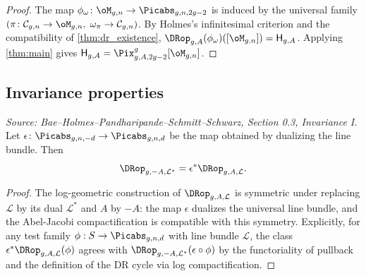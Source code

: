 \begin{proof}
  The map $\phi_\omega\colon \oM_{g,n} \to \Picabs_{g,n,2g-2}$ is induced by the universal
  family $(\pi\colon \mathcal{C}_{g,n} \to \oM_{g,n},\; \omega_\pi \to \mathcal{C}_{g,n})$.
  By Holmes's infinitesimal criterion and the compatibility of \cref{thm:dr_existence},
  $\DRop_{g,A}(\phi_\omega)([\oM_{g,n}]) = \mathsf{H}_{g,A}$.
  Applying \cref{thm:main} gives $\mathsf{H}_{g,A} = \Pix^g_{g,A,2g-2}[\oM_{g,n}]$.
\end{proof}

\subsection{Invariance properties}

\begin{lemma}
  \label{lem:invariance_dualizing}
  \textit{Source: Bae--Holmes--Pandharipande--Schmitt--Schwarz, Section 0.3, Invariance I.}
  Let $\epsilon\colon \Picabs_{g,n,-d} \to \Picabs_{g,n,d}$ be the map obtained by dualizing
  the line bundle.  Then
  \[
    \DRop_{g,-A,\mathcal{L}^*} = \epsilon^* \DRop_{g,A,\mathcal{L}}.
  \]
\end{lemma}

\begin{proof}
  The log-geometric construction of $\DRop_{g,A,\mathcal{L}}$ is symmetric under replacing
  $\mathcal{L}$ by its dual $\mathcal{L}^*$ and $A$ by $-A$: the map
  $\epsilon$ dualizes the universal line bundle, and the Abel-Jacobi compactification is
  compatible with this symmetry. Explicitly, for any test family $\phi: S \to \Picabs_{g,n,d}$
  with line bundle $\mathcal{L}$, the class $\epsilon^*\DRop_{g,A,\mathcal{L}}(\phi)$ agrees
  with $\DRop_{g,-A,\mathcal{L}^*}(\epsilon \circ \phi)$ by the functoriality of pullback
  and the definition of the DR cycle via log compactification.
\end{proof}

